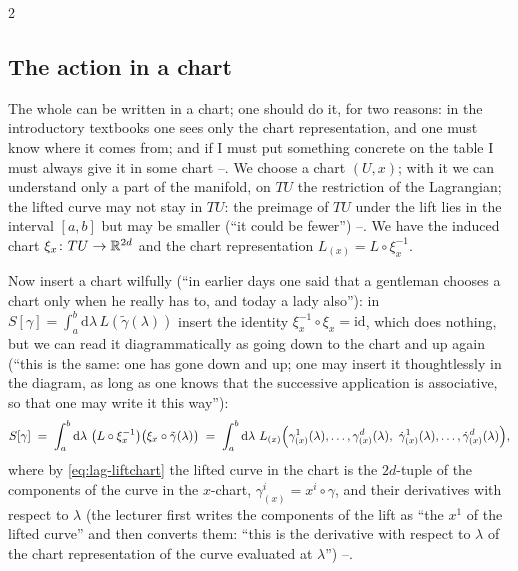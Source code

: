 \begin{paracol}{2}
\subsection{The action in a chart}\label{ssec:lag-actionchart}

The whole can be written in a chart; one should do it, for two reasons: in the introductory textbooks one sees only the chart representation, and one must know where it comes from; and if I must put something concrete on the table I must always give it in some chart --. We choose a chart $(U,x)$; with it we can understand only a part of the manifold, on $TU$ the restriction of the Lagrangian; the lifted curve may not stay in $TU$: the preimage of $TU$ under the lift lies in the interval $[a,b]$ but may be smaller (``it could be fewer'') --. We have the induced chart $\xi_x\colon TU\to\mathbb{R}^{2d}$ and the chart representation $L_{(x)}=L\circ\xi_x^{-1}$.

Now insert a chart wilfully (``in earlier days one said that a gentleman chooses a chart only when he really has to, and today a lady also''): in
$S[\gamma]=\int_a^b\mathrm d\lambda\,L(\tilde\gamma(\lambda))$ insert the identity $\xi_x^{-1}\circ\xi_x=\mathrm{id}$, which does nothing, but we can read it diagrammatically as going down to the chart and up again (``this is the same: one has gone down and up; one may insert it thoughtlessly in the diagram, as long as one knows that the successive application is associative, so that one may write it this way''):
\begin{equation}\label{eq:lag-Schart}
  S[\gamma]\;=\;\int_a^b\mathrm d\lambda\ \bigl(L\circ\xi_x^{-1}\bigr)\bigl(\xi_x\circ\tilde\gamma(\lambda)\bigr)\;=\;\int_a^b\mathrm d\lambda\ L_{(x)}\Bigl(\gamma^1_{(x)}(\lambda),\dots,\gamma^d_{(x)}(\lambda),\ \dot\gamma^1_{(x)}(\lambda),\dots,\dot\gamma^d_{(x)}(\lambda)\Bigr),
\end{equation}
where by \eqref{eq:lag-liftchart} the lifted curve in the chart is the $2d$-tuple of the components of the curve in the $x$-chart, $\gamma^i_{(x)}=x^i\circ\gamma$, and their derivatives with respect to $\lambda$ (the lecturer first writes the components of the lift as ``the $x^1$ of the lifted curve'' and then converts them: ``this is the derivative with respect to $\lambda$ of the chart representation of the curve evaluated at $\lambda$'') --.


\end{paracol}
